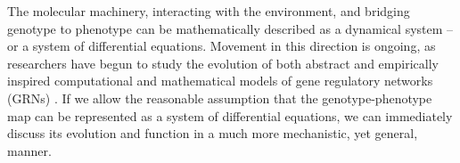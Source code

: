 \documentclass[9 pt]{article}
\newcommand{\1}{\mathbbm{1}}
\begin{document}

The molecular machinery, interacting with the environment, and bridging genotype to phenotype
can be mathematically described as a dynamical system -- or a system of differential equations\citep{jaeger2015comet}.
 Movement in this direction is ongoing, as researchers have begun to study 
the evolution of both abstract \citep{wagner1994evolution, wagner1996does,  siegal2002waddington, bergman2003evolutionary, draghi2015robustness} and empirically inspired computational and mathematical models of gene regulatory networks (GRNs) \citep{mjolsness1991connectionist, jaeger2004dynamic, maria1, vitaly1, vitaly2, crombach2016gap, wotton2015quantitative, chertkova2017insilico}. If we allow the reasonable assumption that the genotype-phenotype map can be represented as a system of differential equations, we can immediately discuss its evolution and function in a much more mechanistic, yet general, manner. 
\end{document}
